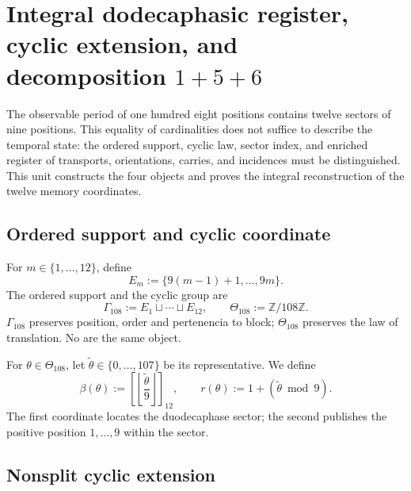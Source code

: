 
\chapter{Integral dodecaphasic register, cyclic extension, and decomposition \(1+5+6\)}
\label{chap:registro-dodecafasico-integral}

The observable period of one hundred eight positions contains twelve sectors of
nine positions. This equality of cardinalities does not suffice to describe the
temporal state: the ordered support, cyclic law, sector index, and
enriched register of transports, orientations, carries, and incidences must be
distinguished. This unit constructs the four objects and proves
the integral reconstruction of the twelve memory coordinates.

\section{Ordered support and cyclic coordinate}

For \(m\in\{1,\ldots,12\}\), define
\begin{equation}
 E_m:=\{9(m-1)+1,\ldots,9m\}.
 \label{eq:u006d-bloques-nonadicos}
\end{equation}
The ordered support and the cyclic group are
\begin{equation}
 \Gamma_{108}:=
 E_1\sqcup\cdots\sqcup E_{12},
 \qquad
 \Theta_{108}:=\mathbb Z/108\mathbb Z.
 \label{eq:u006d-gamma-theta}
\end{equation}
\(\Gamma_{108}\) preserves position, order and pertenencia to block;
\(\Theta_{108}\) preserves the law of translation. No are the same object.

For \(\theta\in\Theta_{108}\), let
\(\widetilde\theta\in\{0,\ldots,107\}\) be its representative. We define
\begin{equation}
 \beta(\theta):=
 \left[
 \left\lfloor\frac{\widetilde\theta}{9}\right\rfloor
 \right]_{12},
 \qquad
 r(\theta):=1+(\widetilde\theta\bmod9).
 \label{eq:u006d-coordenadas-bloque-residuo}
\end{equation}
The first coordinate locates the duodecaphase sector; the second publishes
the positive position \(1,\ldots,9\) within the sector.

\section{Nonsplit cyclic extension}

